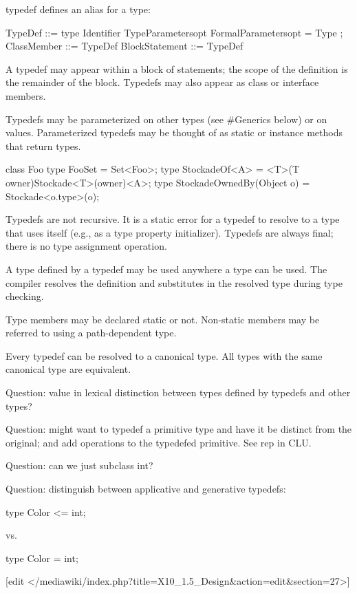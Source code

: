 typedef defines an alias for a type:

TypeDef ::= type Identifier TypeParametersopt FormalParametersopt = Type ;
ClassMember ::= TypeDef
BlockStatement ::= TypeDef

A typedef may appear within a block of statements; the scope of the
definition is the remainder of the block. Typedefs may also appear as
class or interface members.

Typedefs may be parameterized on other types (see #Generics below) or on
values. Parameterized typedefs may be thought of as static or instance
methods that return types.

class Foo {
 type FooSet = Set<Foo>;
 type StockadeOf<A> = <T>(T owner)Stockade<T>(owner)<A>;
 type StockadeOwnedBy(Object o) = Stockade<o.type>(o);
}

Typedefs are not recursive. It is a static error for a typedef to
resolve to a type that uses itself (e.g., as a type property
initializer). Typedefs are always final; there is no type assignment
operation.

A type defined by a typedef may be used anywhere a type can be used. The
compiler resolves the definition and substitutes in the resolved type
during type checking.

Type members may be declared static or not. Non-static members may be
referred to using a path-dependent type.

Every typedef can be resolved to a canonical type. All types with the
same canonical type are equivalent.

Question: value in lexical distinction between types defined by typedefs
and other types?

Question: might want to typedef a primitive type and have it be distinct
from the original; and add operations to the typedefed primitive. See
rep in CLU.

Question: can we just subclass int?

Question: distinguish between applicative and generative typedefs:

type Color <= int;

vs.

type Color = int;

[edit </mediawiki/index.php?title=X10_1.5_Design&action=edit&section=27>]

